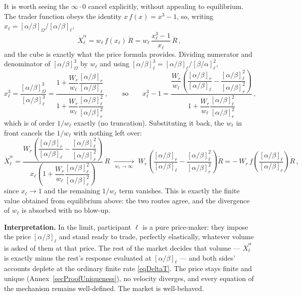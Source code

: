 \documentclass[letterpaper]{article}
\newcommand{\priceAB}{\left[\alpha / \beta\right]}
\newcommand{\priceBA}{\left[\beta / \alpha\right]}
\begin{document}
It is worth seeing the $\infty \cdot 0$ cancel explicitly, without appealing to equilibrium. The trader function obeys the identity $x\,f(x) = x^3 - 1$, so, writing $x_\ell = \priceAB_\Omega / \priceAB_\ell$,
\begin{equation*}
    \dot{X}_\ell^\alpha = w_\ell\, f(x_\ell)\, \dot{R} = w_\ell\, \frac{x_\ell^3 - 1}{x_\ell}\, \dot{R} \,,
\end{equation*}
and the cube is exactly what the price formula provides. Dividing numerator and denominator of $\priceAB_\Omega^3$ by $w_\ell$ and using $\priceAB_\ell^3 = \priceAB_\ell / \priceBA_\ell^2$,
\begin{equation*}
    x_\ell^3 = \frac{\priceAB_\Omega^3}{\priceAB_\ell^3}
    = \frac{1 + \dfrac{W_r}{w_\ell}\dfrac{\priceAB_r}{\priceAB_\ell}}{1 + \dfrac{W_r}{w_\ell}\dfrac{\priceAB_\ell^2}{\priceAB_r^2}} \,,
    \qquad\text{so}\qquad
    x_\ell^3 - 1 = \frac{\dfrac{W_r}{w_\ell}\!\left(\dfrac{\priceAB_r}{\priceAB_\ell} - \dfrac{\priceAB_\ell^2}{\priceAB_r^2}\right)}{1 + \dfrac{W_r}{w_\ell}\dfrac{\priceAB_\ell^2}{\priceAB_r^2}} \,,
\end{equation*}
which is of order $1/w_\ell$ exactly (no truncation). Substituting it back, the $w_\ell$ in front cancels the $1/w_\ell$ with nothing left over:
\begin{equation*}
    \dot{X}_\ell^\alpha = \frac{W_r\!\left(\dfrac{\priceAB_r}{\priceAB_\ell} - \dfrac{\priceAB_\ell^2}{\priceAB_r^2}\right)}{x_\ell\!\left(1 + \dfrac{W_r}{w_\ell}\dfrac{\priceAB_\ell^2}{\priceAB_r^2}\right)}\, \dot{R}
    \;\xrightarrow[\;w_\ell \to \infty\;]{}\;
    W_r\!\left(\frac{\priceAB_r}{\priceAB_\ell} - \frac{\priceAB_\ell^2}{\priceAB_r^2}\right) \dot{R}
    = -\,W_r\, f\!\left(\frac{\priceAB_\ell}{\priceAB_r}\right)\dot{R} \,,
\end{equation*}
since $x_\ell \to 1$ and the remaining $1/w_\ell$ term vanishes. This is exactly the finite value obtained from equilibrium above: the two routes agree, and the divergence of $w_\ell$ is absorbed with no blow-up.

\textbf{Interpretation.} In the limit, participant $\ell$ is a pure price-maker: they impose the price $\priceAB_\ell$ and stand ready to trade, perfectly elastically, whatever volume is asked of them at that price. The rest of the market decides that volume --- $\dot{X}_\ell^\alpha$ is exactly minus the rest's response evaluated at $\priceAB_\ell$ --- and both sides' accounts deplete at the ordinary finite rate \eqref{eqDeltaT}. The price stays finite and unique (Annex~\ref{secProofUniqueness}), no velocity diverges, and every equation of the mechanism remains well-defined. The market is well-behaved.
\end{document}
